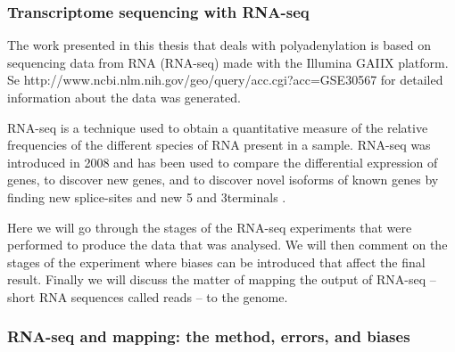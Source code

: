 %
\subsubsection{Transcriptome sequencing with RNA-seq}
The work presented in this thesis that deals with polyadenylation is based on
sequencing data from RNA (RNA-seq) made with the Illumina GAIIX platform. Se
http://www.ncbi.nlm.nih.gov/geo/query/acc.cgi?acc=GSE30567 for detailed
information about the data was generated.

RNA-seq is a technique used to obtain a quantitative measure of the relative
frequencies of the different species of RNA present in a sample. RNA-seq was
introduced in 2008 \cite{nagalakshmi_transcriptional_2008-1} and has been used
to compare the differential expression of genes, to discover new genes, and to
discover novel isoforms of known genes by finding new splice-sites and new 5\p
and 3\p terminals \cite{wang_rna-seq:_2009}.

Here we will go through the stages of the RNA-seq experiments that were
performed to produce the data that was analysed. We will then comment on the
stages of the experiment where biases can be introduced that affect the final
result. Finally we will discuss the matter of mapping the output of RNA-seq --
short RNA sequences called reads -- to the genome.

\subsubsection{RNA-seq and mapping: the method, errors, and biases}

